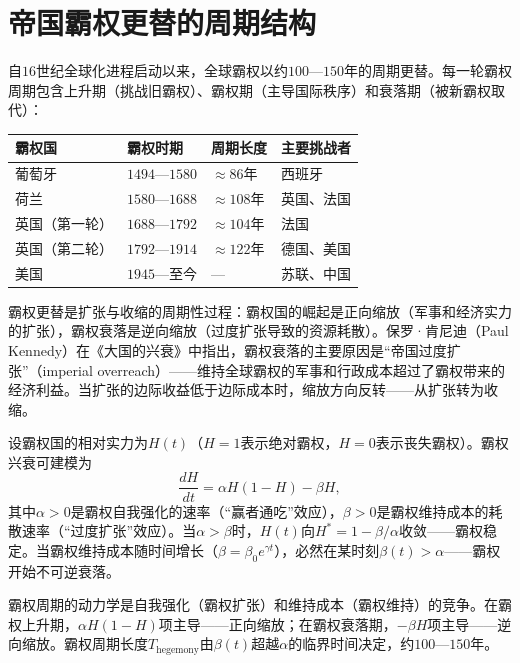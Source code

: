 \section{帝国霸权更替的周期结构}

\begin{definition}[全球霸权的周期更替]\label{def:hegemony_cycle}
自$16$世纪全球化进程启动以来，全球霸权以约$100$—$150$年的周期更替。每一轮霸权周期包含上升期（挑战旧霸权）、霸权期（主导国际秩序）和衰落期（被新霸权取代）：
\begin{center}
\begin{tabular}{>{\centering\arraybackslash}p{2cm}>{\centering\arraybackslash}p{2.5cm}>{\centering\arraybackslash}p{2.5cm}>{\centering\arraybackslash}p{3cm}}
\toprule
霸权国 & 霸权时期 & 周期长度 & 主要挑战者 \\
\midrule
葡萄牙 & $1494$—$1580$ & $\approx 86$年 & 西班牙 \\
荷兰 & $1580$—$1688$ & $\approx 108$年 & 英国、法国 \\
英国（第一轮） & $1688$—$1792$ & $\approx 104$年 & 法国 \\
英国（第二轮） & $1792$—$1914$ & $\approx 122$年 & 德国、美国 \\
美国 & $1945$—至今 & — & 苏联、中国 \\
\bottomrule
\end{tabular}
\end{center}
霸权更替是扩张与收缩的周期性过程：霸权国的崛起是正向缩放（军事和经济实力的扩张），霸权衰落是逆向缩放（过度扩张导致的资源耗散）。保罗·肯尼迪（Paul Kennedy）在《大国的兴衰》中指出，霸权衰落的主要原因是“帝国过度扩张”（imperial overreach）——维持全球霸权的军事和行政成本超过了霸权带来的经济利益。当扩张的边际收益低于边际成本时，缩放方向反转——从扩张转为收缩。
\end{definition}

\begin{proposition}[霸权周期的动力学模型]\label{prop:hegemony_dynamics}
设霸权国的相对实力为$H(t)$（$H = 1$表示绝对霸权，$H = 0$表示丧失霸权）。霸权兴衰可建模为
\[
\frac{dH}{dt} = \alpha H(1-H) - \beta H,
\]
其中$\alpha > 0$是霸权自我强化的速率（“赢者通吃”效应），$\beta > 0$是霸权维持成本的耗散速率（“过度扩张”效应）。当$\alpha > \beta$时，$H(t)$向$H^* = 1 - \beta/\alpha$收敛——霸权稳定。当霸权维持成本随时间增长（$\beta = \beta_0 e^{\gamma t}$），必然在某时刻$\beta(t) > \alpha$——霸权开始不可逆衰落。

霸权周期的动力学是自我强化（霸权扩张）和维持成本（霸权维持）的竞争。在霸权上升期，$\alpha H(1-H)$项主导——正向缩放；在霸权衰落期，$-\beta H$项主导——逆向缩放。霸权周期长度$T_{\text{hegemony}}$由$\beta(t)$超越$\alpha$的临界时间决定，约$100$—$150$年。
\end{proposition}

